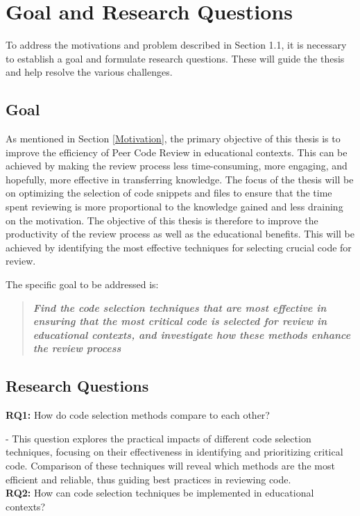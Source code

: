 \section{Goal and Research Questions}
To address the motivations and problem described in Section 1.1, it is necessary to establish a goal and formulate research questions. These will guide the thesis and help resolve the various challenges.

\subsection{Goal}
As mentioned in Section \ref{Motivation}, the primary objective of this thesis is to improve the efficiency of Peer Code Review in educational contexts. This can be achieved by making the review process less time-consuming, more engaging, and hopefully, more effective in transferring knowledge. The focus of the thesis will be on optimizing the selection of code snippets and files to ensure that the time spent reviewing is more proportional to the knowledge gained and less draining on the motivation. The objective of this thesis is therefore to improve the productivity of the review process as well as the educational benefits. This will be achieved by identifying the most effective techniques for selecting crucial code for review.
\newpage

The specific goal to be addressed is:
\begin{quote}
    \textbf{\textit{Find the code selection techniques that are most effective in ensuring that the most critical code is selected for review in educational contexts, and investigate how these methods enhance the review process}}
\end{quote}

\subsection{Research Questions}

\noindent\textbf{RQ1:} How do code selection methods compare to each other?

- This question explores the practical impacts of different code selection techniques, focusing on their effectiveness in identifying and prioritizing critical code. Comparison of these techniques will reveal which methods are the most efficient and reliable, thus guiding best practices in reviewing code.\\


\noindent \textbf{RQ2:} How can code selection techniques be implemented in educational contexts?

